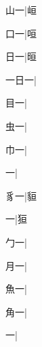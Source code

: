 \begin{multicols}{2}
{{\cjk{}{\cnsym{}　}山一}|{\cjk{}峘}\par
{\cjk{}{\cnsym{}　}口一}|{\cjk{}咺}\par
{\cjk{}{\cnsym{}　}日一}|{\cjk{}晅}\par
{\cjk{}一日一}|{}\par
{\cjk{}{\cnsym{}　}目一}|{}\par
{\cjk{}{\cnsym{}　}虫一}|{}\par
{\cjk{}{\cnsym{}　}巾一}|{}\par
{一}|{}\par
{\cjk{}{\cnsym{}　}豸一}|{\cjk{}貆}\par
{一}|{\cjk{}狟}\par
{\cjk{}{\cnsym{}　}勹一}|{}\par
{\cjk{}{\cnsym{}　}月一}|{}\par
{\cjk{}{\cnsym{}　}魚一}|{}\par
{\cjk{}{\cnsym{}　}角一}|{}\par
{一}|{}\par
}
\end{multicols}
